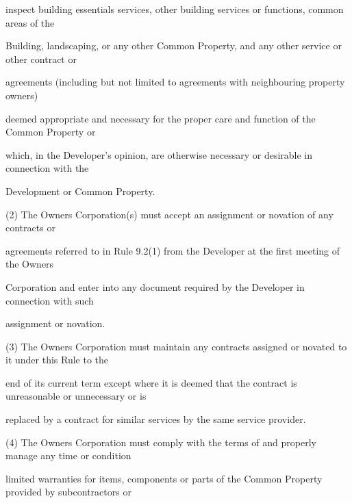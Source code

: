 \documentclass{article}
\begin{document}
{\fontsize{10.02}{1}inspect building essentials services, other building services or functions, common areas of the }

{\fontsize{10.02}{1}Building, landscaping, or any other Common Property, and any other service or other contract or }

{\fontsize{10.02}{1}agreements (including but not limited to agreements with neighbouring property owners) }

{\fontsize{10.02}{1}deemed appropriate and necessary for the proper care and function of the Common Property or }

{\fontsize{10.02}{1}which, in the Developer’s opinion, are otherwise necessary or desirable in connection with the }

{\fontsize{10.02}{1}Development or Common Property. }

{\fontsize{9.962}{1}(2) The Owners Corporation(s) must accept an assignment or novation of any contracts or }

{\fontsize{10.02}{1}agreements referred to in Rule 9.2(1) from the Developer at the first meeting of the Owners }

\newpage


















{\fontsize{10.02}{1}Corporation and enter into any document required by the Developer in connection with such }

{\fontsize{10.02}{1}assignment or novation. }

{\fontsize{9.962}{1}(3) The Owners Corporation must maintain any contracts assigned or novated to it under this Rule to the }

{\fontsize{10.02}{1}end of its current term except where it is deemed that the contract is unreasonable or unnecessary or is }

{\fontsize{10.02}{1}replaced by a contract for similar services by the same service provider. }


{\fontsize{9.962}{1}(4) The Owners Corporation must comply with the terms of and properly manage any time or condition }

{\fontsize{10.02}{1}limited warranties for items, components or parts of the Common Property provided by subcontractors or }
\end{document}
